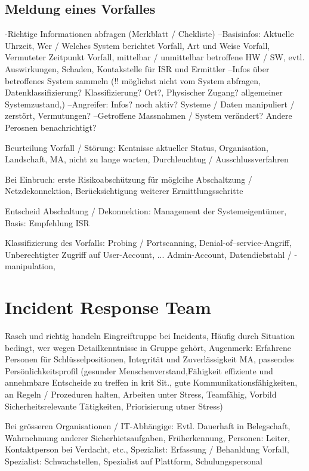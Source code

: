 \subsection{Meldung eines Vorfalles}
-Richtige Informationen abfragen (Merkblatt / Chekliste)
--Basisinfos: Aktuelle Uhrzeit, Wer / Welches System berichtet Vorfall, Art und Weise Vorfall, Vermuteter Zeitpunkt Vorfall, mittelbar / unmittelbar betroffene HW / SW, evtl. Auswirkungen, Schaden, Kontakstelle für ISR und Ermittler
--Infos über betroffenes System sammeln (!! möglichst nicht vom System abfragen, Datenklassifizierung? Klassifizierung? Ort?, Physischer Zugang?  allgemeiner Systemzustand,)
--Angreifer: Infos? noch aktiv? Systeme / Daten manipuliert / zerstört, Vermutungen?
--Getroffene Massnahmen / System verändert? Andere Perosnen benachrichtigt?

Beurteilung Vorfall / Störung: Kentnisse aktueller Status, Organisation, Landschaft, MA, nicht zu lange warten, Durchleuchtug / Ausschlussverfahren

Bei Einbruch: erste Risikoabschützung für möglcihe Abschaltzung / Netzdekonnektion, Berücksichtigung weiterer Ermittlungsschritte

Entscheid Abschaltung / Dekonnektion: Management der Systemeigentümer, Basis: Empfehlung ISR

Klassifizierung  des Vorfalls: Probing  / Portscanning, Denial-of--service-Angriff, Unberechtigter Zugriff auf User-Account, ... Admin-Account, Datendiebstahl / -manipulation,
\section{Incident Response Team}
Rasch und richtig handeln
Eingreiftruppe bei Incidents, Häufig durch Situation bedingt, wer wegen Detailkenntnisse in Gruppe gehört,
Augenmerk: Erfahrene Personen für Schlüsselpositionen, Integrität und Zuverlässigkeit MA, passendes Persönlichkeitsprofil (gesunder Menschenverstand,Fähigkeit effiziente und annehmbare Entscheide zu treffen in krit Sit., gute Kommunikationsfähigkeiten, an Regeln / Prozeduren halten, Arbeiten unter Stress, Teamfähig, Vorbild Sicherheitsrelevante Tätigkeiten, Priorisierung utner Stress)

Bei grösseren Organisationen / IT-Abhängige: Evtl. Dauerhaft in Belegschaft, Wahrnehmung anderer Sicherhietsaufgaben, Früherkennung, Personen: Leiter, Kontaktperson bei Verdacht, etc., Spezialist: Erfassung / Behanldung Vorfall, Spezialist: Schwachstellen, Spezialist auf Plattform, Schulungspersonal

